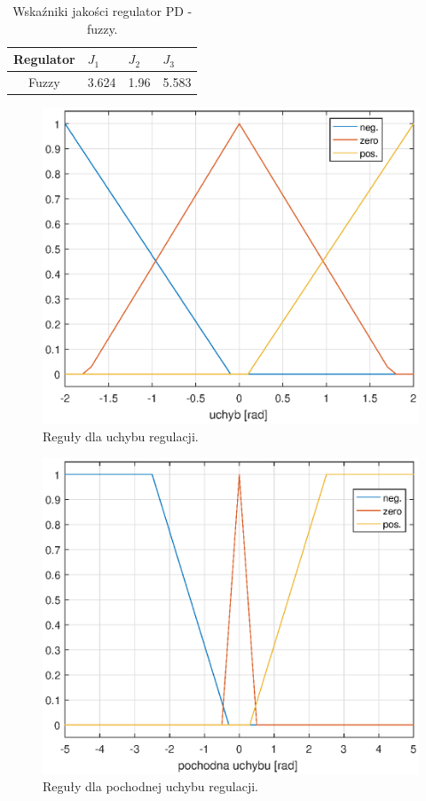 \begin{table}[h]
	\caption{Wska\'zniki jakości regulator PD - fuzzy.}
	\label{fuzzy_wsk}
	\centering
	
	\begin{tabular}{|c|M{2.5cm}|M{2.5cm}|M{2.5cm}|}
		\hline
		Regulator &$J_1$&$J_2$&$J_3$\\
		\hline
		Fuzzy &3.624&  1.96 &  5.583\\
		\hline
		
	\end{tabular}
\end{table}


\begin{figure}[h!]
	\centering
	\includegraphics[scale = 0.8]{fig/e_rules.eps}
	\caption		
	{Reguły dla uchybu regulacji.}
	\label{e_rules}
\end{figure}


\begin{figure}[h!]
	\centering
	\includegraphics[scale = 0.8]{fig/de_rules.eps}
	\caption		
	{Reguły dla pochodnej uchybu regulacji.}
	\label{de_rules}
\end{figure}


